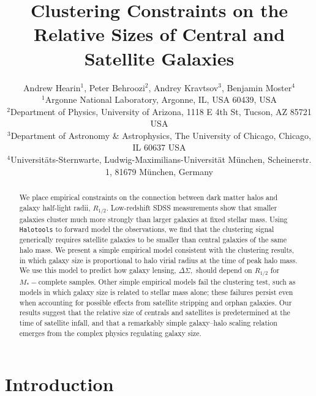 \documentclass[usenatbib,usegraphicx,letterpaper]{mn2e}
\newcommand{\rhalf}{R_{1/2}}
\newcommand{\mstar}{M_{\ast}}
\begin{document}
\title[The Relative Sizes of Centrals and Satellites]
{Clustering Constraints on the Relative Sizes of Central and Satellite Galaxies}


\author[Hearin, Behroozi, Kravtsov \& Moster]{
Andrew Hearin$^{1}$, Peter Behroozi$^{2}$, Andrey Kravtsov$^{3}$, Benjamin Moster$^{4}$\\
$^{1}$Argonne National Laboratory, Argonne, IL, USA 60439, USA\\
$^{2}$Department of Physics, University of Arizona, 1118 E 4th St, Tucson, AZ 85721 USA\\
$^{3}$Department of Astronomy \& Astrophysics, The University of Chicago, Chicago, IL 60637 USA\\
$^{4}$Universit{\"a}ts-Sternwarte, Ludwig-Maximilians-Universit{\"a}t M{\"u}nchen, Scheinerstr. 1, 81679 M{\"u}nchen, Germany
}

\maketitle

\begin{abstract}
We place empirical constraints on the connection between dark matter halos and galaxy half-light radii, $\rhalf.$ Low-redshift SDSS measurements show that smaller galaxies cluster much more strongly than larger galaxies at fixed stellar mass. Using {\tt Halotools} to forward model the observations, we find that the clustering signal generically requires satellite galaxies to be smaller than central galaxies of the same halo mass. We present a simple empirical model consistent with the clustering results, in which galaxy size is proportional to halo virial radius at the time of peak halo mass. We use this model to predict how galaxy lensing, $\Delta\Sigma,$ should depend on $\rhalf$ for $\mstar-$complete samples. Other simple empirical models fail the clustering test, such as models in which galaxy size is related to stellar mass alone; these failures persist even when accounting for possible effects from satellite stripping and orphan galaxies. Our results suggest that the relative size of centrals and satellites is predetermined at the time of satellite infall, and that a remarkably simple galaxy--halo scaling relation emerges from the complex physics regulating galaxy size.
\end{abstract}

\section{Introduction}
\label{sec:intro}
\end{document}
